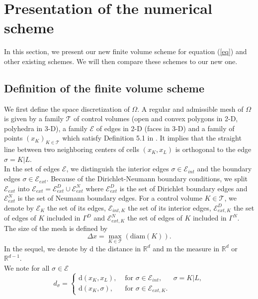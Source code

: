\documentclass[smallextended]{svjour3}
\begin{document}

\section{Presentation of the numerical scheme} 

In this section, we present our new finite volume scheme for equation (\ref{eq}) and other existing schemes. We will then compare these schemes to our new one.

\subsection{Definition of the finite volume scheme}

We first define the space discretization of $\Omega$. A regular and admissible mesh of $\Omega$ is given by a family $\mathcal{T}$ of control volumes (open and convex polygons in 2-D, polyhedra in 3-D), a family $\mathcal{E}$ of edges in 2-D (faces in 3-D) and a family of points $(x_{K})_{K \in \mathcal{T}}$ which satisfy Definition 5.1 in \cite{Eymard2000}. It implies that the straight line between two neighboring centers of cells $(x_{K},x_{L})$ is orthogonal to the edge $\sigma=K|L$. \\
In the set of edges $ \mathcal{E}$, we distinguish the interior edges $\sigma \in \mathcal{E}_{int}$ and the boundary edges $\sigma \in \mathcal{E}_{ext}$. Because of the Dirichlet-Neumann boundary conditions, we split $\mathcal{E}_{ext}$ into $ \mathcal{E}_{ext}=\mathcal{E}_{ext}^{D} \cup \mathcal{E}_{ext}^{N}$ where $ \mathcal{E}_{ext}^{D}$ is the set of Dirichlet boundary edges and $ \mathcal{E}_{ext}^{N}$ is the set of Neumann boundary edges. For a control volume $K \in \mathcal{T}$, we denote by $\mathcal{E}_{K}$ the set of its edges, $\mathcal{E}_{int,K}$ the set of its interior edges, $\mathcal{E}_{ext,K}^{D}$ the set of edges of $K$ included in $\Gamma^{D}$ and $\mathcal{E}_{ext,K}^{N}$ the set of edges of $K$ included in $\Gamma^{N}$.\\
The size of the mesh is defined by 
\begin{equation*}
\Delta x=\max_{K \in \mathcal{T}}(\text{diam}(K)).
\end{equation*}
In the sequel, we denote by d the distance in $\mathbb{R}^{d}$ and m the measure in $\mathbb{R}^{d}$ or $ \mathbb{R}^{d-1}$. \\
We note for all $\sigma \in \mathcal{E}$
\begin{equation*}
d_{\sigma}=\left\{\begin{array}{lll} \text{d}(x_{K},x_{L}), & \text{ for } \sigma \in \mathcal{E}_{int},& \sigma=K|L,\\ \text{d}(x_{K},\sigma), & \text{ for } \sigma \in \mathcal{E}_{ext,K}.\end{array}\right.
\end{equation*}
\end{document}
